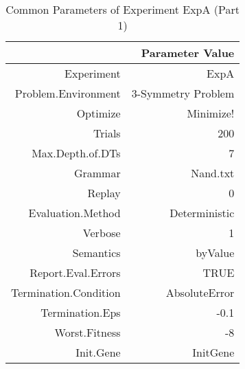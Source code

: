 \begin{table}[ht]
\centering
\begin{tabular}{rr}
  \hline
 & Parameter Value \\ 
  \hline
Experiment & ExpA \\ 
  Problem.Environment & 3-Symmetry Problem \\ 
  Optimize & Minimize! \\ 
  Trials & 200 \\ 
  Max.Depth.of.DTs & 7 \\ 
  Grammar & Nand.txt \\ 
  Replay & 0 \\ 
  Evaluation.Method & Deterministic \\ 
  Verbose & 1 \\ 
  Semantics & byValue \\ 
  Report.Eval.Errors & TRUE \\ 
  Termination.Condition & AbsoluteError \\ 
  Termination.Eps & -0.1 \\ 
  Worst.Fitness & -8 \\ 
  Init.Gene & InitGene \\ 
   \hline
\end{tabular}
\caption{Common Parameters of Experiment ExpA (Part 1)} 
\end{table}
